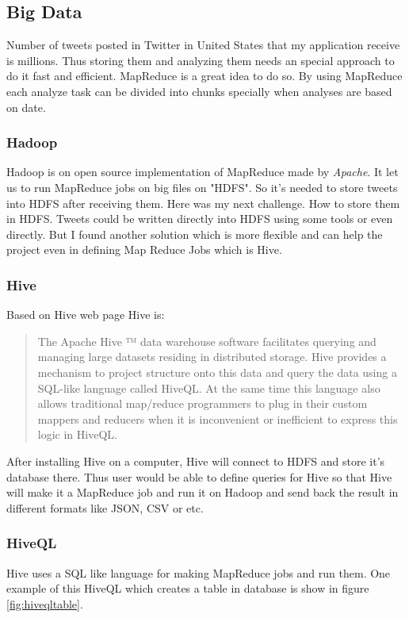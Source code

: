 \documentclass[a4paper,11pt]{report}
\begin{document}
\subsection{Big Data}
Number of tweets posted in Twitter in United States that my application receive is millions. Thus storing them and analyzing them needs an special approach to do it fast and efficient. MapReduce is a great idea to do so. By using MapReduce each analyze task can be divided into chunks specially when analyses are based on date.

\subsubsection{Hadoop}
Hadoop is on open source implementation of MapReduce made by \emph{Apache}. It let us to run MapReduce jobs on big files on "HDFS". So it's needed to store tweets into HDFS after receiving them. Here was my next challenge. How to store them in HDFS. Tweets could be written directly into HDFS using some tools or even directly. But I found another solution which is more flexible and can help the project even in defining Map Reduce Jobs which is Hive.

\subsubsection{Hive}
Based on Hive web page Hive is:
\begin{quote}
The Apache Hive ™ data warehouse software facilitates querying and managing large datasets residing in distributed storage. Hive provides a mechanism to project structure onto this data and query the data using a SQL-like language called HiveQL. At the same time this language also allows traditional map/reduce programmers to plug in their custom mappers and reducers when it is inconvenient or inefficient to express this logic in HiveQL.
\end{quote}
After installing Hive on a computer, Hive will connect to HDFS and store it's database there. Thus user would be able to define queries for Hive so that Hive will make it a MapReduce job and run it on Hadoop and send back the result in different formats like JSON, CSV or etc.

\subsubsection{HiveQL}
Hive uses a SQL like language for making MapReduce jobs and run them. One example of this HiveQL which creates a table in database is show in figure \ref{fig:hiveqltable}.
\end{document}
